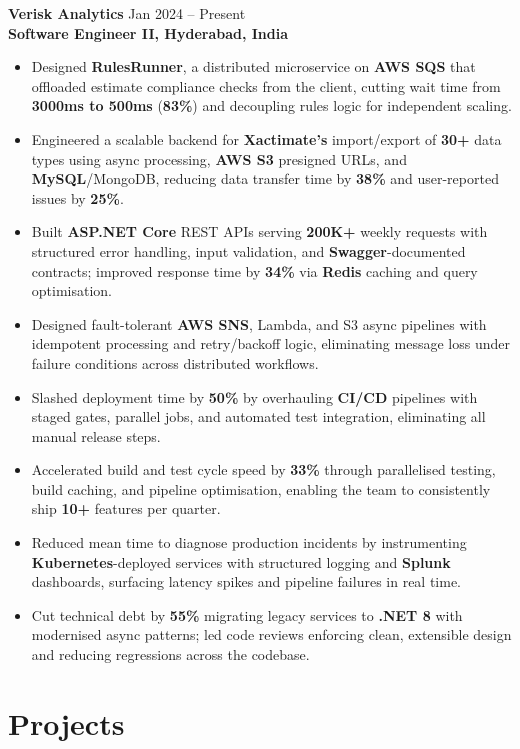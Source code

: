 \documentclass[a4paper,10pt]{article}
\begin{document}
\textbf{Verisk Analytics} \hfill Jan 2024 -- Present \\
\textbf{Software Engineer II, Hyderabad, India}
\begin{itemize}[leftmargin=*]
    \item Designed \textbf{RulesRunner}, a distributed microservice on \textbf{AWS SQS} that offloaded estimate compliance checks from the client, cutting wait time from \textbf{3000ms to 500ms} (\textbf{83\%}) and decoupling rules logic for independent scaling.
    \item Engineered a scalable backend for \textbf{Xactimate's} import/export of \textbf{30+} data types using async processing, \textbf{AWS S3} presigned URLs, and \textbf{MySQL}/MongoDB, reducing data transfer time by \textbf{38\%} and user-reported issues by \textbf{25\%}.
    \item Built \textbf{ASP.NET Core} REST APIs serving \textbf{200K+} weekly requests with structured error handling, input validation, and \textbf{Swagger}-documented contracts; improved response time by \textbf{34\%} via \textbf{Redis} caching and query optimisation.
    \item Designed fault-tolerant \textbf{AWS SNS}, Lambda, and S3 async pipelines with idempotent processing and retry/backoff logic, eliminating message loss under failure conditions across distributed workflows.
    \item Slashed deployment time by \textbf{50\%} by overhauling \textbf{CI/CD} pipelines with staged gates, parallel jobs, and automated test integration, eliminating all manual release steps.
    \item Accelerated build and test cycle speed by \textbf{33\%} through parallelised testing, build caching, and pipeline optimisation, enabling the team to consistently ship \textbf{10+} features per quarter.
    \item Reduced mean time to diagnose production incidents by instrumenting \textbf{Kubernetes}-deployed services with structured logging and \textbf{Splunk} dashboards, surfacing latency spikes and pipeline failures in real time.
    \item Cut technical debt by \textbf{55\%} migrating legacy services to \textbf{.NET 8} with modernised async patterns; led code reviews enforcing clean, extensible design and reducing regressions across the codebase.
\end{itemize}

\section*{Projects}
\end{document}
